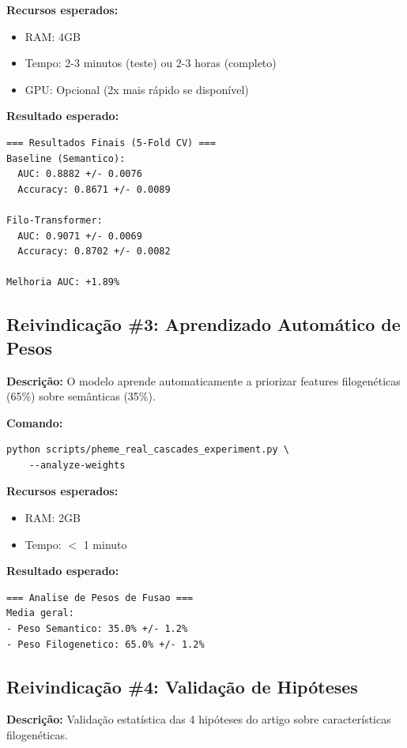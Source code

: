 \documentclass[12pt]{article}
\begin{document}
\textbf{Recursos esperados:}
\begin{itemize}
    \item RAM: 4GB
    \item Tempo: 2-3 minutos (teste) ou 2-3 horas (completo)
    \item GPU: Opcional (2x mais r\'apido se dispon\'ivel)
\end{itemize}

\textbf{Resultado esperado:}
\begin{verbatim}
=== Resultados Finais (5-Fold CV) ===
Baseline (Semantico):
  AUC: 0.8882 +/- 0.0076
  Accuracy: 0.8671 +/- 0.0089

Filo-Transformer:
  AUC: 0.9071 +/- 0.0069
  Accuracy: 0.8702 +/- 0.0082

Melhoria AUC: +1.89%
\end{verbatim}

\subsection{Reivindica\c{c}\~ao \#3: Aprendizado Autom\'atico de Pesos}

\textbf{Descri\c{c}\~ao:} O modelo aprende automaticamente a priorizar features filogen\'eticas (65\%) sobre sem\^anticas (35\%).

\textbf{Comando:}
\begin{verbatim}
python scripts/pheme_real_cascades_experiment.py \
    --analyze-weights
\end{verbatim}

\textbf{Recursos esperados:}
\begin{itemize}
    \item RAM: 2GB
    \item Tempo: $<$ 1 minuto
\end{itemize}

\textbf{Resultado esperado:}
\begin{verbatim}
=== Analise de Pesos de Fusao ===
Media geral:
- Peso Semantico: 35.0% +/- 1.2%
- Peso Filogenetico: 65.0% +/- 1.2%
\end{verbatim}

\subsection{Reivindica\c{c}\~ao \#4: Valida\c{c}\~ao de Hip\'oteses}

\textbf{Descri\c{c}\~ao:} Valida\c{c}\~ao estat\'istica das 4 hip\'oteses do artigo sobre caracter\'isticas filogen\'eticas.
\end{document}
